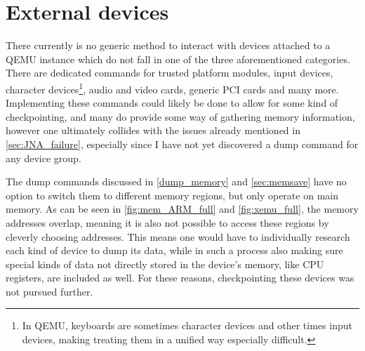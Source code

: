 \section{External devices}
There currently is no generic method to interact with devices attached to a QEMU instance
which do not fall in one of the three aforementioned categories.
There are dedicated commands for trusted platform modules, input devices, character devices\footnote{In QEMU, keyboards are sometimes character devices and other times input devices, making treating them in a unified way especially difficult.},
audio and video cards, generic PCI cards and many more\cite{qmp-commands}.
Implementing these commands could likely be done to allow for some kind of checkpointing,
and many do provide some way of gathering memory information,
however one ultimately collides with the issues already mentioned in \autoref{sec:JNA_failure},
especially since I have not yet discovered a dump command for any device group.

The dump commands discussed in \autoref{dump_memory} and \autoref{sec:memsave}
have no option to switch them to different memory regions, but only operate on main memory.
As can be seen in \autoref{fig:mem_ARM_full} and \autoref{fig:xemu_full},
the memory addresses overlap, meaning it is also not possible to access these regions
by cleverly choosing addresses.
This means one would have to individually research each kind of device to dump its data,
while in such a process also making sure special kinds of data not directly stored in the device's memory,
like CPU registers, are included as well.
For these reasons, checkpointing these devices was not pursued further.